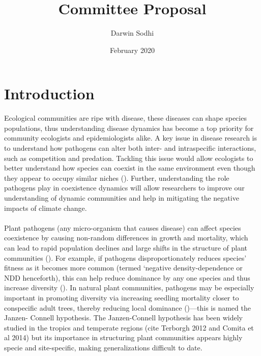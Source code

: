 \documentclass{article}
\title{Committee Proposal}
\author{Darwin Sodhi}
\date{February 2020}
\begin{document}
\maketitle

\section{Introduction}

Ecological communities are ripe with disease, these diseases can shape species populations, thus understanding disease dynamics has become a top priority for community ecologists and epidemiologists alike. A key issue in disease research is to understand how pathogens can alter both inter- and intraspecific interactions, such as competition and predation. Tackling this issue would allow ecologists to better understand how species can coexist in the same environment even though they appear to occupy similar niches (\citep{Freckleton2006}). Further, understanding the role pathogens play in coexistence dynamics will allow researchers to improve our understanding of dynamic communities and help in mitigating the negative impacts of climate change.  

\paragraph{}Plant pathogens (any micro-organism that causes disease) can affect species coexistence by causing non-random differences in growth and mortality, which can lead to rapid population declines and large shifts in the structure of plant communities (\citep{Gilbert2002}). For example, if pathogens disproportionately reduces species’ fitness as it becomes more common (termed ‘negative density-dependence or NDD henceforth), this can help reduce dominance by any one species and thus increase diversity (\citep{Chesson2000}). In natural plant communities, pathogens may be especially important in promoting diversity via increasing seedling mortality closer to conspecific adult trees, thereby reducing local dominance (\citep{HilleRisLambers2012})—this is named the Janzen- Connell hypothesis. The Janzen-Connell hypothesis has been widely studied in the tropics and temperate regions (cite Terborgh 2012 and Comita et al 2014) but its importance in structuring plant communities appears highly specie and site-specific, making generalizations difficult to date.  
\end{document}
